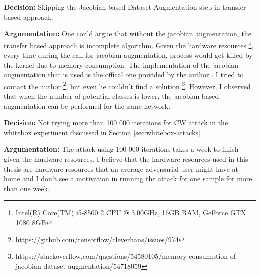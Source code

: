 \textbf{Decision:} Skipping the Jacobian-based Dataset Augmentation step in transfer based approach.

\textbf{Argumentation:} One could argue that without the jacobian augmentation, the transfer based approach is incomplete algorithm. Given the hardware resources \footnote{Intel(R) Core(TM) i5-8500 2 CPU @ 3.00GHz, 16GB RAM, GeForce GTX 1080 8GB}, every time during the call for jacobian augmentation, process would get killed by the kernel due to memory consumption. The implementation of the jacobian augmentation that is used is the offical one provided by the author \cite{papernot2018cleverhans}. I tried to contact the author \footnote{https://github.com/tensorflow/cleverhans/issues/974}, but even he couldn't find a solution \footnote{https://stackoverflow.com/questions/54580105/memory-consumption-of-jacobian-dataset-augmentation/54718059}. However, I observed that when the number of potential classes is lower, the jacobian-based augmentation can be performed for the same network.

\textbf{Decision:} 
Not trying more than 100 000 iterations for CW attack in the whitebox experiment discussed in Section \ref{sec:whitebox-attacks}.

\textbf{Argumentation:}
The attack using 100 000 iterations takes a week to finish given the hardware resources. I believe that the hardware resources used in this thesis are hardware resources that an average adversarial user might have at home and I don't see a motivation in running the attack for one sample for more than one week.
